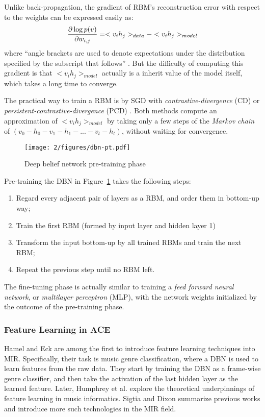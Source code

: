 Unlike back-propagation, the gradient of RBM's reconstruction error with respect to the weights can be expressed easily as:
\begin{equation}
{\partial \log p(v) \over \partial w_{i,j}} = <v_ih_j>_{data} - <v_ih_j>_{model}
\end{equation}
where ``angle brackets are used to denote expectations under the distribution specified by the subscript that follows'' \cite{hinton2010practical}. But the difficulty of computing this gradient is that $<v_ih_j>_{model}$ actually is a inherit value of the model itself, which takes a long time to converge.

The practical way to train a RBM is by SGD with {\it contrastive-divergence} \cite{hinton2010practical} (CD) or {\it persistent-contrastive-divergence} (PCD) \cite{tieleman2008training}. Both methods compute an approximation of $<v_ih_j>_{model}$ by taking only a few steps of the {\it Markov chain} of $(v_0- h_0-v_1-h_1-...-v_t-h_t)$, without waiting for convergence.

\begin{figure}[htb]
\centering
\texttt{[image: 2/figures/dbn-pt.pdf]}
\caption{Deep belief network pre-training phase}
\label{fig:2-dbn-pt}
\end{figure}
Pre-training the DBN in Figure~\ref{fig:2-dbn-pt} takes the following steps:
\begin{enumerate}
\item Regard every adjacent pair of layers as a RBM, and order them in bottom-up way;
\item Train the first RBM (formed by input layer and hidden layer 1)
\item Transform the input bottom-up by all trained RBMs and train the next RBM;
\item Repeat the previous step until no RBM left.
\end{enumerate}

The fine-tuning phase is actually similar to training a {\it feed forward neural network}, or {\it multilayer perceptron} (MLP), with the network weights initialized by the outcome of the pre-training phase. 

\subsubsection{Feature Learning in ACE}
Hamel and Eck \cite{hamel2010learning} are among the first to introduce feature learning techniques into MIR. Specifically, their task is music genre classification, where a DBN is used to learn features from the raw data. They start by training the DBN as a frame-wise genre classifier, and then take the activation of the last hidden layer as the learned feature. Later, Humphrey et al. \cite{humphrey2013feature} explore the theoretical underpinnings of feature learning in music informatics. Sigtia and Dixon \cite{sigtia2014improved} summarize previous works and introduce more such technologies in the MIR field.

